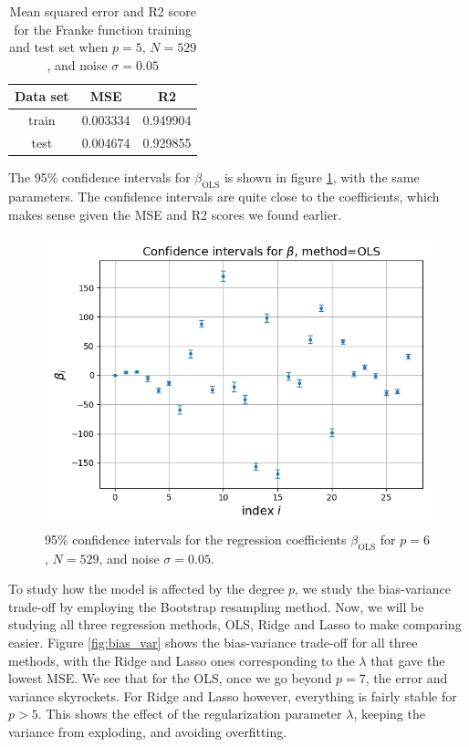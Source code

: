 \documentclass[a4paper]{article}
\begin{document}
\begin{table}[H]
  \centering
  \caption{Mean squared error and R2 score for the Franke function training and test set when $p=5$, $N=529$, and noise $\sigma = 0.05$}
  \label{tab:franke_a}
  \begin{tabular}{c|c|c}
    Data set & MSE & R2\\\hline
    train & 0.003334 & 0.949904\\
    test & 0.004674 & 0.929855
    \end{tabular}
\end{table}
The 95\% confidence intervals for $\beta_{\text{OLS}}$ is shown in figure \ref{fig:confbetaOLS}, with the same parameters. The confidence intervals are quite close to the coefficients, which makes sense given the MSE and R2 scores we found earlier.
\begin{figure}[H]
	\centering
	\includegraphics[scale=0.5]{../figures/task_a/beta_conf_int_OLS_N529_nf23_p6_noise0.05_seed4155_beta28.png}
	\caption{95\% confidence intervals for the regression coefficients $\beta_{\text{OLS}}$ for $p=6$, $N=529$, and noise $\sigma=0.05$.}
	\label{fig:confbetaOLS}
\end{figure}
To study how the model is affected by the degree $p$, we study the bias-variance trade-off by employing the Bootstrap resampling method. Now, we will be studying all three regression methods, OLS, Ridge and Lasso to make comparing easier. 
Figure \ref{fig:bias_var} shows the bias-variance trade-off for all three methods, with the Ridge and Lasso ones corresponding to the $\lambda$ that gave the lowest MSE. We see that for the OLS, once we go beyond $p=7$, the error and variance skyrockets. For Ridge and Lasso however, everything is fairly stable for $p>5$. This shows the effect of the regularization parameter $\lambda$, keeping the variance from exploding, and avoiding overfitting.
\end{document}
